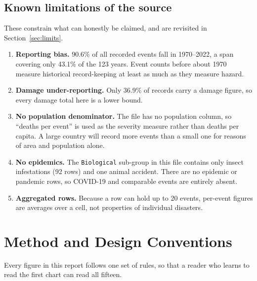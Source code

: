 \documentclass[11pt,a4paper]{article}
\begin{document}
\subsection{Known limitations of the source}
\label{sec:sourcelimits}

These constrain what can honestly be claimed, and are revisited in
Section~\ref{sec:limits}.

\begin{enumerate}
\item \textbf{Reporting bias.} 90.6\% of all recorded events fall in 1970--2022,
  a span covering only 43.1\% of the 123 years. Event counts before about 1970
  measure historical record-keeping at least as much as they measure hazard.
\item \textbf{Damage under-reporting.} Only 36.9\% of records carry a damage
  figure, so every damage total here is a lower bound.
\item \textbf{No population denominator.} The file has no population column, so
  ``deaths per event'' is used as the severity measure rather than deaths per
  capita. A large country will record more events than a small one for reasons
  of area and population alone.
\item \textbf{No epidemics.} The \texttt{Biological} sub-group in this file
  contains only insect infestations (92 rows) and one animal accident. There are
  no epidemic or pandemic rows, so COVID-19 and comparable events are entirely
  absent.
\item \textbf{Aggregated rows.} Because a row can hold up to 20 events, per-event
  figures are averages over a cell, not properties of individual disasters.
\end{enumerate}

\section{Method and Design Conventions}
\label{sec:method}

Every figure in this report follows one set of rules, so that a reader who learns
to read the first chart can read all fifteen.
\end{document}
